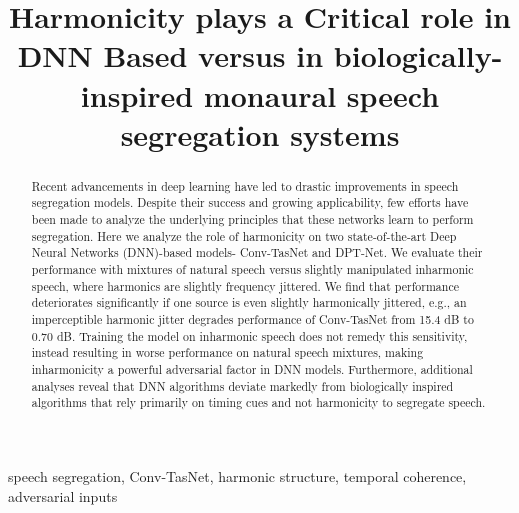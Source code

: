 \documentclass{article}
\title{Harmonicity plays a Critical role in DNN Based versus in biologically-inspired monaural speech segregation systems}
\begin{document}
\maketitle
\begin{abstract}
Recent advancements in deep learning have led to drastic improvements in speech segregation models. Despite their success and growing applicability, few efforts have been made to analyze the underlying principles that these networks learn to perform segregation. Here we analyze the role of harmonicity on two state-of-the-art Deep Neural Networks (DNN)-based models- Conv-TasNet and DPT-Net\cite{luo2019conv, chen2020dual}. We evaluate their performance with mixtures of natural speech versus slightly manipulated inharmonic speech, where harmonics are slightly frequency jittered. We find that performance deteriorates significantly if one source is even slightly harmonically jittered, e.g., an imperceptible  harmonic jitter degrades performance of Conv-TasNet from 15.4 dB to 0.70 dB.
Training the model on inharmonic speech does not remedy this sensitivity, instead resulting in worse performance on natural speech mixtures, making inharmonicity a powerful adversarial factor in DNN models. Furthermore, additional analyses reveal that DNN algorithms deviate markedly from biologically inspired algorithms\cite{krishnan2014segregating} that rely primarily on timing cues and not harmonicity to segregate speech.


\end{abstract}
\begin{keywords}
speech segregation, Conv-TasNet, harmonic structure, temporal coherence, adversarial inputs
\end{keywords}
\end{document}
